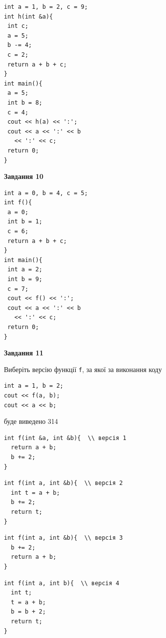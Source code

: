 \documentclass[12pt, ukrainian]{article}
\def\code#1{\Verb!#1!}
\begin{document}
{\begin {large}
\begin{minipage}[t]{7.0cm}
\begin{verbatim}
int a = 1, b = 2, c = 9;
int h(int &a){
 int c;
 a = 5;
 b -= 4;
 c = 2;
 return a + b + c;
}
int main(){
 a = 5;
 int b = 8;
 c = 4;
 cout << h(a) << ':';
 cout << a << ':' << b 
   << ':' << c;
 return 0;
}
\end{verbatim}



\begin{center}
\textbf{Завдання 10}
\end{center}
\vspace{-8mm}

\begin{verbatim}
int a = 0, b = 4, c = 5;
int f(){
 a = 0;
 int b = 1;
 c = 6;
 return a + b + c;
}
int main(){
 int a = 2;
 int b = 9;
 c = 7;
 cout << f() << ':';
 cout << a << ':' << b 
   << ':' << c;
 return 0;
}
\end{verbatim}

\end{minipage}
\vline \hspace{1mm}
\begin{minipage}[t]{11.0cm}

\begin{center}
\textbf{Завдання 11}
\end{center}
Виберіть версію функції \code{f}, за якої за виконання коду
\begin{verbatim}
int a = 1, b = 2;
cout << f(a, b);
cout << a << b;
\end{verbatim}

буде виведено 314

\begin{verbatim}
int f(int &a, int &b){  \\ версія 1
  return a + b;
  b += 2;
}
\end{verbatim}

\vspace{-8mm}\begin{verbatim}
int f(int a, int &b){  \\ версія 2
  int t = a + b;
  b += 2;
  return t;
}
\end{verbatim}

\vspace{-8mm}\begin{verbatim}
int f(int a, int &b){  \\ версія 3
  b += 2;
  return a + b;
}
\end{verbatim}

\vspace{-8mm}\begin{verbatim}
int f(int a, int b){  \\ версія 4
  int t;
  t = a + b;
  b = b + 2;
  return t;
}
\end{verbatim}




\end{minipage}
\end{large}}
\end{document}

